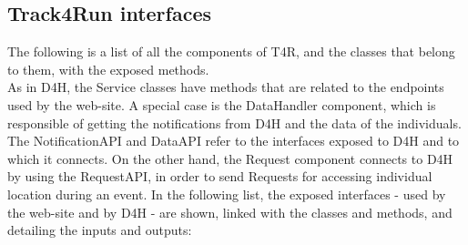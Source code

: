 \documentclass[a4paper, hidelinks, 12pt]{report}
\begin{document}
	\subsection{Track4Run interfaces}
	The following is a list of all the components of T4R, and the classes that belong to them, with the exposed methods. \\
	
		As in D4H, the Service classes have methods that are related to the endpoints used by the web-site. A special case is the DataHandler component, which is responsible of getting the notifications from D4H and the data of the individuals. The  NotificationAPI and DataAPI refer to the interfaces exposed to D4H and to which it connects. On the other hand, the Request component connects to D4H by using the RequestAPI, in order to send Requests for accessing individual location during an event. In the following list, the exposed interfaces - used by the web-site and by D4H - are shown, linked with the classes and methods, and detailing the inputs and outputs:
\end{document}
